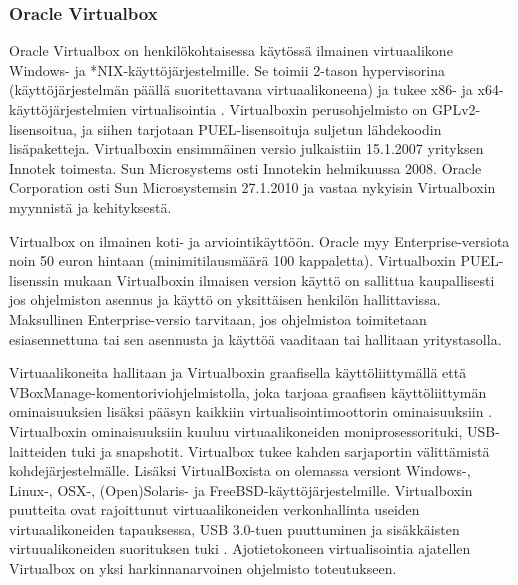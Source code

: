 \subsubsection{Oracle Virtualbox}
Oracle Virtualbox on henkilökohtaisessa käytössä ilmainen virtuaalikone Windows- ja *NIX-käyttöjärjestelmille. Se toimii 2-tason hypervisorina (käyttöjärjestelmän päällä suoritettavana virtuaalikoneena) ja tukee x86- ja x64-käyttöjärjestelmien virtualisointia \cite{virtualbox_manual}. Virtualboxin perusohjelmisto on GPLv2-lisensoitua, ja siihen tarjotaan  PUEL-lisensoituja suljetun lähdekoodin lisäpaketteja. Virtualboxin ensimmäinen versio julkaistiin 15.1.2007 yrityksen Innotek toimesta. Sun Microsystems osti Innotekin helmikuussa 2008. Oracle Corporation osti Sun Microsystemsin 27.1.2010 ja vastaa nykyisin Virtualboxin myynnistä ja kehityksestä.



Virtualbox on ilmainen koti- ja arviointikäyttöön. Oracle myy Enterprise-versiota noin 50 euron hintaan (minimitilausmäärä 100 kappaletta).
Virtualboxin PUEL-lisenssin mukaan Virtualboxin ilmaisen version käyttö on sallittua kaupallisesti jos ohjelmiston asennus ja käyttö on yksittäisen henkilön hallittavissa. Maksullinen Enterprise-versio tarvitaan, jos ohjelmistoa toimitetaan esiasennettuna tai sen asennusta ja käyttöä vaaditaan tai hallitaan yritystasolla.\cite{virtualbox_puel,virtualbox_licensing}

Virtuaalikoneita hallitaan ja Virtualboxin graafisella käyttöliittymällä että VBoxManage-komentoriviohjelmistolla, joka tarjoaa graafisen käyttöliittymän ominaisuuksien lisäksi pääsyn kaikkiin virtualisointimoottorin ominaisuuksiin \cite{virtualbox_manual}. Virtualboxin ominaisuuksiin kuuluu virtuaalikoneiden moniprosessorituki, USB-laitteiden tuki ja snapshotit. Virtualbox tukee kahden sarjaportin välittämistä kohdejärjestelmälle. Lisäksi VirtualBoxista on olemassa versiont Windows-, Linux-, OSX-, (Open)Solaris- ja FreeBSD-käyttöjärjestelmille. Virtualboxin puutteita ovat rajoittunut virtuaalikoneiden verkonhallinta useiden virtuaalikoneiden tapauksessa, USB 3.0-tuen puuttuminen ja sisäkkäisten virtuualikoneiden suorituksen tuki \cite{vplayervsvbox}. Ajotietokoneen virtualisointia ajatellen Virtualbox on yksi harkinnanarvoinen ohjelmisto toteutukseen.


